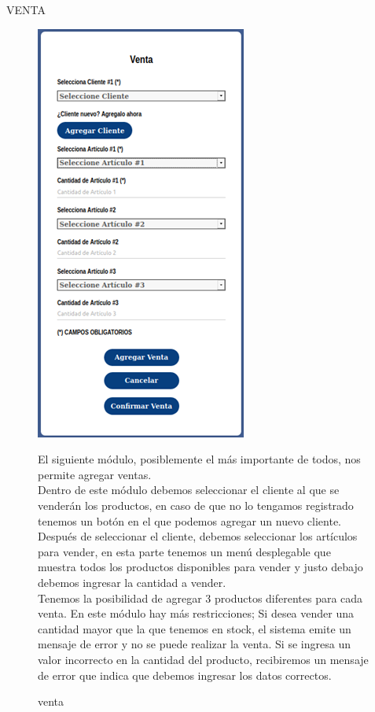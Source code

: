 \documentclass{article}
\begin{document}
\begin{center}
VENTA
\end{center}
\begin{figure}[ht]
\begin{minipage}[t]{0.5\linewidth}
\caption {venta}
\centering
\includegraphics[scale=1]{fig6}
\end{minipage}
\begin{minipage}[t]{0.5\linewidth}
El siguiente módulo, posiblemente el más importante de todos, nos permite agregar ventas.\\

Dentro de este módulo debemos seleccionar el cliente al que se venderán los productos, en caso de que no lo tengamos registrado tenemos un botón en el que podemos agregar un nuevo cliente.\\

Después de seleccionar el cliente, debemos seleccionar los artículos para vender, en esta parte tenemos un menú desplegable que muestra todos los productos disponibles para vender y justo debajo debemos ingresar la cantidad a vender. \\

Tenemos la posibilidad de agregar 3 productos diferentes para cada venta. En este módulo hay más restricciones; Si desea vender una cantidad mayor que la que tenemos en stock, el sistema emite un mensaje de error y no se puede realizar la venta. Si se ingresa un valor incorrecto en la cantidad del producto, recibiremos un mensaje de error que indica que debemos ingresar los datos correctos.\\


\end{minipage}
\end{figure}
\end{document}
